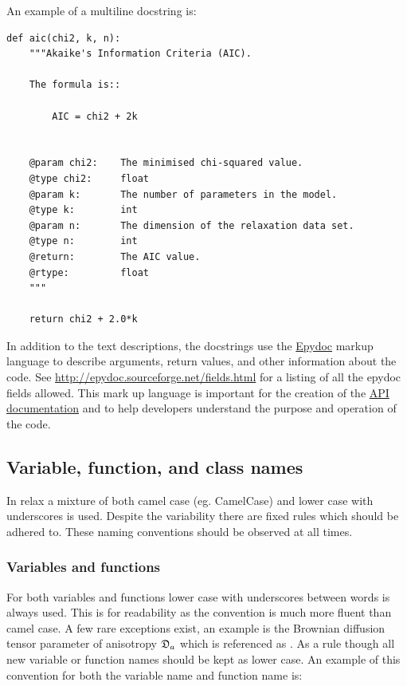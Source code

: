 An example of a multiline docstring is:

\begin{footnotesize}
\begin{verbatim}
def aic(chi2, k, n):
    """Akaike's Information Criteria (AIC).

    The formula is::

        AIC = chi2 + 2k


    @param chi2:    The minimised chi-squared value.
    @type chi2:     float
    @param k:       The number of parameters in the model.
    @type k:        int
    @param n:       The dimension of the relaxation data set.
    @type n:        int
    @return:        The AIC value.
    @rtype:         float
    """

    return chi2 + 2.0*k
\end{verbatim}
\end{footnotesize}

In addition to the text descriptions, the docstrings use the \href{http://epydoc.sourceforge.net/}{Epydoc} markup language to describe arguments, return values, and other information about the code.  See \href{http://epydoc.sourceforge.net/fields.html}{http://epydoc.sourceforge.net/fields.html} for a listing of all the epydoc fields allowed.  This mark up language is important for the creation of the \href{http://www.nmr-relax.com/api/}{API documentation} and to help developers understand the purpose and operation of the code.


\subsection{Variable, function, and class names}

In relax a mixture of both camel case (eg. CamelCase) and lower case with underscores is used.  Despite the variability there are fixed rules which should be adhered to.  These naming conventions should be observed at all times.



\subsubsection{Variables and functions}

For both variables and functions lower case with underscores between words is always used.  This is for readability as the convention is much more fluent than camel case.  A few rare exceptions exist, an example is the Brownian diffusion tensor parameter of anisotropy $\mathfrak{D}_a$ which is referenced as .  As a rule though all new variable or function names should be kept as lower case.  An example of this convention for both the variable name and function name is:

